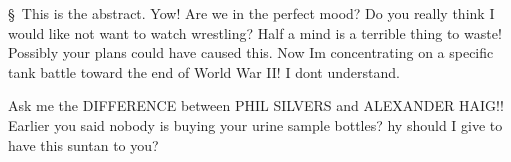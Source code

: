 \documentclass [cropmarks, frame, english, master]{idaexhibitpage}
\author {Lars Niclas Jonsson}
\begin{document}
\exhibitpagebeforeabstract 
\S  \ This is the abstract. Yow! Are we in the perfect mood? Do you really think I would like not want to watch wrestling? Half a mind is a terrible thing to waste! Possibly your plans could have caused this. Now Im concentrating on a specific tank battle toward the end of World War II! I dont understand. \par Ask me the DIFFERENCE between PHIL SILVERS and ALEXANDER HAIG!! Earlier you said nobody is buying your urine sample bottles? hy should I give to have this suntan to you? 
\exhibitpageafterabstract 
\end{document}
